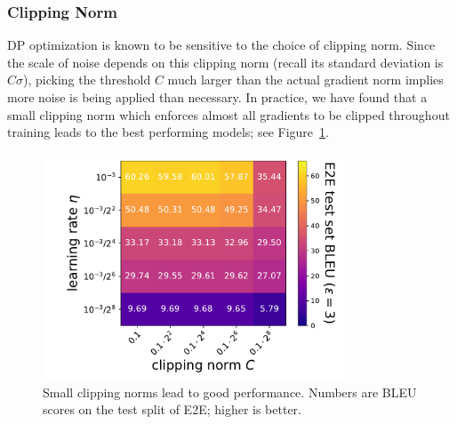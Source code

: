 
\subsubsection{Clipping Norm}
DP optimization is known to be sensitive to the choice of clipping norm.
Since the scale of noise depends on this clipping norm (recall its standard deviation is $C \sigma$), picking the threshold $C$ much larger than the actual gradient norm implies more noise is being applied than necessary.
In practice, we have found that a small clipping norm which enforces almost all gradients to be clipped throughout training leads to the best performing models; see Figure~\ref{fig:app_hyperparameter}.


\begin{figure}[H]
\begin{center}
\centering
\includegraphics[width=0.8\textwidth]{figs/cn_vs_lr_BLEU.pdf}
\end{center}
\caption{
Small clipping norms lead to good performance.
Numbers are BLEU scores on the test split of E2E; higher is better.
}
\label{fig:app_hyperparameter}
\end{figure}
